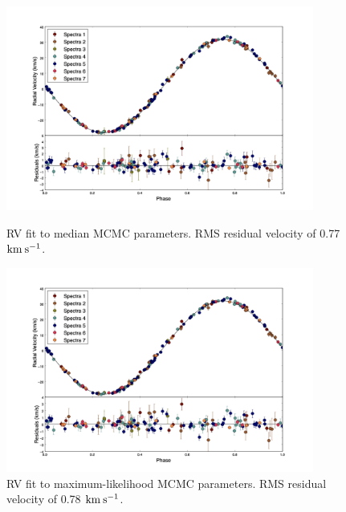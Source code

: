 \documentclass{article}
\begin{document}
\clearpage

\begin{figure}[!htb]
\centering
\includegraphics[width=0.9\textwidth]{RVfit_meds_100000_errorMult.jpg}
\caption{RV fit to median MCMC parameters. RMS residual velocity of 0.77 $\rm{km \: s^{-1}}$.}

\includegraphics[width=0.9\textwidth]{RVfit_best_100000_errorMult.jpg}
\caption{RV fit to maximum-likelihood MCMC parameters. RMS residual velocity of 0.78 $\rm{km \: s^{-1}}$.}
\end{figure}
\end{document}
